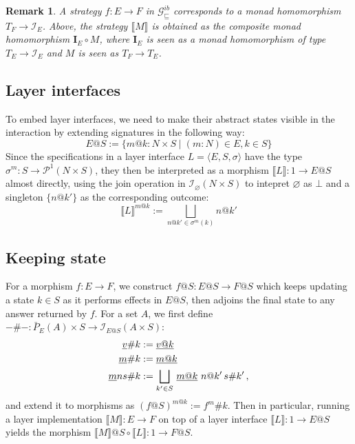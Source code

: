 \documentclass[11pt,oneside,draft]{book}
\newtheorem{remark}[theorem]{Remark}
\theoremstyle{definition}
\newcommand{\gcat}{\mathcal{G}_{\sqsubseteq}}
\newcommand{\ul}[1]{%
  \underline{\smash{#1}}
}
\begin{document}
\begin{remark}
A strategy $f : E \rightarrow F$ in $\gcat^{ib}$
corresponds to a monad homomorphism $T_F \rightarrow \mathcal{I}_E$.
Above,
the strategy $\llbracket M \rrbracket$
is obtained as the composite monad homomorphism
$\mathbf{I}_E \circ M$,
where $\mathbf{I}_E$ is seen as
a monad homomorphism of type $T_E \rightarrow \mathcal{I}_E$
and $M$ is seen as $T_F \rightarrow T_E$.
\end{remark}


\subsection{Layer interfaces} %

To embed layer interfaces,
we need to make their abstract states
visible in the interaction
by extending signatures in the following way:
\[
  E@S :=
    \{ m@k : N \times S \mid
       (m \mathbin: N) \in E, k \in S \}
\]
Since the specifications in a layer interface
$L = \langle E, S, \sigma \rangle$
have the type $\sigma^m : S \rightarrow \mathcal{P}^1(N \times S)$,
they then be interpreted as
a morphism $\llbracket L \rrbracket : 1 \rightarrow E@S$
almost directly,
using the join operation in $\mathcal{I}_\varnothing(N \times S)$
to intepret $\varnothing$ as $\bot$
and a singleton $\{ n@k' \}$ as the corresponding outcome:
\[
  \llbracket L \rrbracket^{m@k} :=
    \bigsqcup_{n@k' \in \sigma^m(k)} n@k'
\]


\subsection{Keeping state} %

For a morphism $f : E \rightarrow F$,
we construct $f@S : E@S \rightarrow F@S$
which keeps updating a state $k \in S$
as it performs effects in $E@S$,
then adjoins the final state to any answer
returned by $f$.
For a set $A$, we first define
$-\#- : \bar{P}_E(A) \times S \rightarrow \mathcal{I}_{E@S}(A \times S)$:
\begin{align*}
  \ul{v}\#k &:= \ul{v@k} \\
  \ul{m}\#k &:= \ul{m@k} \\
  \ul{m}ns\#k &:=
    \bigsqcup_{k' \in S} \, \ul{m@k} \,\, n@k' \, s\#k' \,,
\end{align*}
and extend it to morphisms as $(f@S)^{m@k} := f^m\#k$.
Then in particular,
running a layer implementation
$\llbracket M \rrbracket : E \rightarrow F$
on top of a layer interface
$\llbracket L \rrbracket : 1 \rightarrow E@S$
yields the morphism
$\llbracket M \rrbracket @ S \circ \llbracket L \rrbracket :
 1 \rightarrow F@S$.
\end{document}
